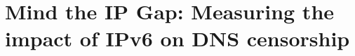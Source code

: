 


% 



\renewcommand{\sectionautorefname}{\S}
\renewcommand{\subsectionautorefname}{\S}
\renewcommand{\subsubsectionautorefname}{\S}

\chapter{Mind the IP Gap: Measuring the impact of IPv6 on DNS censorship}\label{ch:v4vsv6}



%  



















% 
% 

% 

% 
